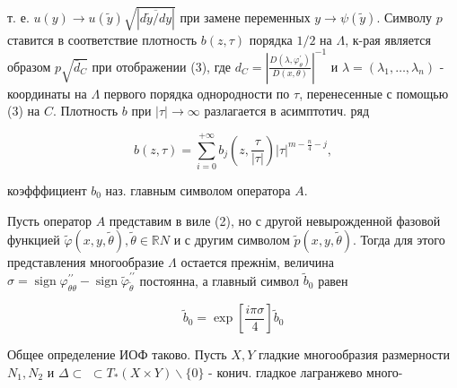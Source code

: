 \documentclass[10pt]{article}
\begin{document}
т. е. $u(y) \rightarrow u(\tilde{y}) \sqrt{|\overline{d \tilde{y} / d y}|}$ при замене переменных $y \rightarrow \psi(\tilde{y})$. Символу $p$ ставится в соответствие плотность $b(z, \tau)$ порядка $1 / 2$ на $\Lambda$, к-рая является образом $p \sqrt{\bar{d}_{C}}$ при отображении (3), где $d_{C}=\left|\frac{D\left(\lambda, \varphi_{\theta}^{\prime}\right)}{D(x, \theta)}\right|^{-1}$ и $\lambda=\left(\lambda_{1}, \ldots, \lambda_{n}\right)$ - координаты на $\Lambda$ первого порядка однородности по $\tau$, перенесенные с помощью (3) на $C$. Плотность $b$ при $|\tau| \rightarrow \infty$ разлагается в асимптотич. ряд



\[

b(z, \tau)=\sum_{i=0}^{+\infty} b_{j}\left(z, \frac{\tau}{|\tau|}\right)|\tau|^{m-\frac{n}{4}-j},

\]



коэфффициент $b_{0}$ наз. главным символом оператора $A$.



Пусть оператор $A$ представим в виле (2), но с другой невырожденной фазовой функцией $\tilde{\varphi}(x, y, \tilde{\theta}), \tilde{\theta} \in \mathbb{R} N$ и с другим символом $\tilde{p}(x, y, \tilde{\theta})$. Тогда для этого представления многообразие $\Lambda$ остается прежнім, величина $\sigma=\operatorname{sign} \varphi_{\theta \theta}^{\prime \prime}-\operatorname{sign} \tilde{\varphi}_{\tilde{\theta}}^{\prime \prime}$ постоянна, а главный символ $\tilde{b}_{0}$ равен



\[

\tilde{b}_{0}=\exp \left[\frac{i \pi \sigma}{4}\right] \tilde{b}_{0}

\]



Общее определение ИОФ таково. Пусть $X, Y$ гладкие многообразия размерности $N_{1}, N_{2}$ и $\Delta \subset$ $\subset T_{*}(X \times Y) \backslash\{0\}$ - конич. гладкое лагранжево много-
\end{document}
